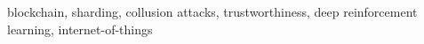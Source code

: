 \documentclass[lettersize,journal]{IEEEtran}
\begin{document}
\begin{IEEEkeywords}
blockchain, sharding, collusion attacks, trustworthiness, deep reinforcement learning, internet-of-things
\end{IEEEkeywords}

\IEEEpeerreviewmaketitle





       








\vfill
\end{document}
